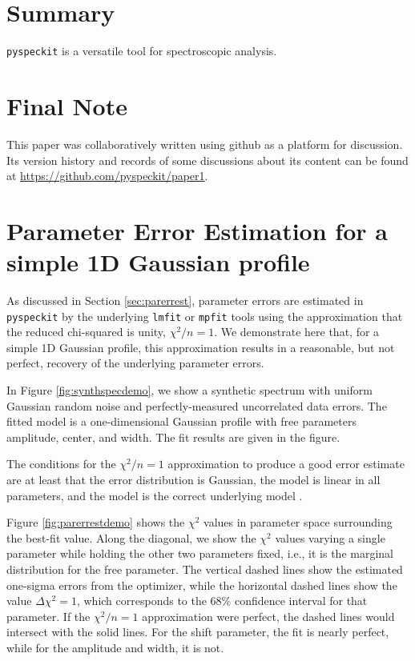 \documentclass[twocolumn]{aastex62}
\newcommand{\pyspeckit}{\texttt{pyspeckit}\xspace}
\begin{document}
\section{Summary}
\texttt{pyspeckit} is a versatile tool for spectroscopic analysis.

\section{Final Note}
This paper was collaboratively written using github as a platform for
discussion.  Its version history and records of some discussions about its
content can be found at \url{https://github.com/pyspeckit/paper1}.




\appendix
\section{Parameter Error Estimation for a simple 1D Gaussian profile}
\label{appendix:parerrest}
As discussed in Section \ref{sec:parerrest}, parameter errors are estimated in
\pyspeckit by the underlying \texttt{lmfit} or \texttt{mpfit} tools using the
approximation that the reduced chi-squared is unity, $\chi^2/n=1$.  We
demonstrate here that, for a simple 1D Gaussian profile, this approximation
results in a reasonable, but not perfect, recovery of the underlying parameter
errors.

In Figure \ref{fig:synthspecdemo}, we show a synthetic spectrum with uniform
Gaussian random noise and perfectly-measured uncorrelated data errors.
The fitted model is a one-dimensional Gaussian profile with free parameters
amplitude, center, and width.  The fit results are given in the figure.

The conditions for the $\chi^2/n=1$ approximation to produce a good error
estimate are at least that the error distribution is Gaussian, the model is
linear in all parameters, and the model is the correct underlying model
\citep{Andrae2010b}.

Figure \ref{fig:parerrestdemo} shows the $\chi^2$ values in parameter space
surrounding the best-fit value.  Along the diagonal, we show the $\chi^2$
values varying a single parameter while holding the other two parameters fixed,
i.e., it is the marginal distribution for the free parameter.  The vertical
dashed lines show the estimated one-sigma errors from the optimizer, while the
horizontal dashed lines show the value $\Delta\chi^2=1$, which corresponds to
the 68\% confidence interval for that parameter.  If the $\chi^2/n=1$
approximation were perfect, the dashed lines would intersect with the solid
lines.  For the shift parameter, the fit is nearly perfect, while for the
amplitude and width, it is not.
\end{document}
